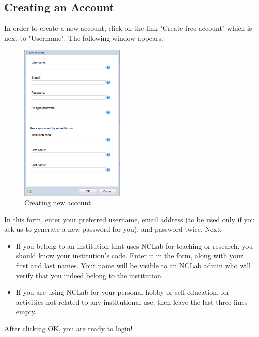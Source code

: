 \documentclass[article,A4,12pt]{llncs}
\begin{document}
\newpage

\subsection{Creating an Account}

In order to create a new account, click on the link "Create free account" which is next to
"Username". The following window appears:

\begin{figure}[!ht]
\begin{center}
\includegraphics[width=0.45\textwidth]{img/create-account.png}
\end{center}
\vspace{-4mm}
\caption{Creating new account.}
\label{fig:creacc}
\end{figure}

\noindent
In this form, enter your preferred username, email address (to be used only if you ask
us to generate a new password for you), and password twice. Next:

\begin{itemize}
\item If you belong to an institution 
      that uses NCLab for teaching or research, you should know your institution's code. Enter it in the form, 
      along with your first and last names. Your name will be visible to an NCLab admin
      who will verify that you indeed belong to the institution.
\item If you are using NCLab for your personal hobby or self-education, for activities not 
      related to any institutional use, then leave the last three lines empty. 
\end{itemize}
After clicking OK, you are ready to login!
\end{document}
